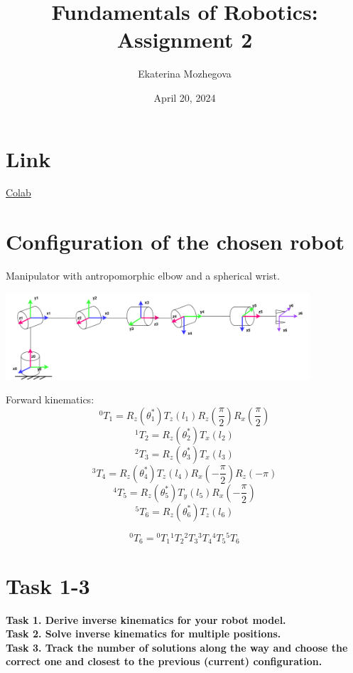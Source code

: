\documentclass{article}
\title{Fundamentals of Robotics: Assignment 2}
\author{Ekaterina Mozhegova}
\date{April 20, 2024}
\begin{document}
\maketitle

\section{Link}

\href{https://colab.research.google.com/drive/1hU13PXIqbAtPv2cby5qNB10PobzW39JC?usp=sharing}{Colab}

\section{Configuration of the chosen robot}

Manipulator with antropomorphic elbow and a spherical wrist. 

\begin{center}
    \includegraphics*[width=0.85\textwidth]{images/new_manipulator.png}
\end{center}

Forward kinematics:
\[{}^0T_1 = R_z(\theta_1^*) T_z(l_1) R_z(\frac{\pi}{2}) R_x(\frac{\pi}{2})\]
\[{}^1T_2 = R_z(\theta_2^*) T_x(l_2) \]
\[{}^2T_3 = R_z(\theta_3^*) T_x(l_3) \]
\[{}^3T_4 = R_z(\theta_4^*) T_z(l_4) R_x(-\dfrac{\pi}{2}) R_z(-\pi)\]
\[{}^4T_5 = R_z(\theta_5^*) T_y(l_5) R_x(-\dfrac{\pi}{2})\]
\[{}^5T_6 = R_z(\theta_6^*) T_z(l_6) \]

\[{}^0T_6 = {}^0T_1 {}^1T_2 {}^2T_3 {}^3T_4 {}^4T_5 {}^5T_6 \]




\section{Task 1-3}
\textbf{Task 1. Derive inverse kinematics for your robot model.\\}
\textbf{Task 2. Solve inverse kinematics for multiple positions.\\}
\textbf{Task 3. Track the number of solutions along the way and choose the correct one and closest to
the previous (current) configuration.}\\
\end{document}
